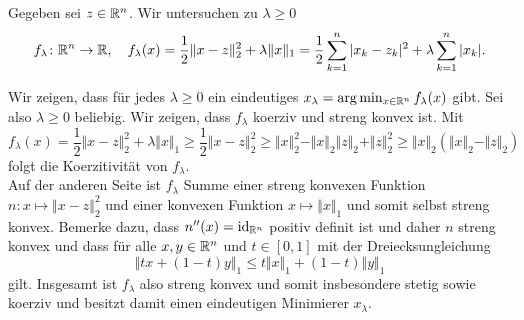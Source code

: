 
Gegeben sei $z\in\mathbb{R}^n$. Wir untersuchen zu $\lambda\geq 0$
\begin{displaymath}
 f_\lambda\colon \mathbb{R}^n\to\mathbb{R},\quad f_\lambda(x)=\frac{1}{2}\Vert x-z\Vert_2^2+\lambda\Vert x\Vert_1=\frac{1}{2}\sum_{k=1}^n |x_k-z_k|^2+\lambda\sum_{k=1}^n|x_k|.
\end{displaymath}
\begin{compactenum}[(i)]
 \item Wir zeigen, dass für jedes $\lambda\geq 0$ ein eindeutiges $x_\lambda = \arg\min_{x\in\mathbb{R}^n}f_\lambda(x)$ gibt. Sei also $\lambda\geq 0$ beliebig.
 Wir zeigen, dass $f_\lambda$ koerziv und streng konvex ist. Mit
 \begin{displaymath}
  f_\lambda(x)=\frac{1}{2}\Vert x-z\Vert_2^2+\lambda\Vert x\Vert_1\geq \frac{1}{2}\Vert x-z\Vert_2^2\geq \Vert x\Vert_2^2-\Vert x\Vert_2\Vert z\Vert_2+\Vert z \Vert_2^2\geq \Vert x\Vert_2(\Vert x\Vert_2-\Vert z\Vert_2)
 \end{displaymath}
 folgt die Koerzitivität von $f_\lambda$.\\
 Auf der anderen Seite ist $f_\lambda$ Summe einer streng konvexen Funktion $n: x\mapsto \Vert x-z\Vert_2^2$ und einer konvexen Funktion $x\mapsto \Vert x\Vert_1$ und
 somit selbst streng konvex. Bemerke dazu, dass $n''(x)=\operatorname{id}_{\mathbb{R}^n}$ positiv definit ist und daher $n$ streng konvex und dass für alle $x,y\in\mathbb{R}^n$ und $t\in [0,1]$
 mit der Dreiecksungleichung
 \begin{displaymath}
  \Vert tx+(1-t)y\Vert_1\leq t\Vert x\Vert_1+(1-t)\Vert y\Vert_1
 \end{displaymath}
 gilt.
 Insgesamt ist $f_\lambda$ also streng konvex und somit insbesondere stetig sowie koerziv und besitzt damit einen eindeutigen Minimierer $x_\lambda$.
 \\
 \item


\end{compactenum}

